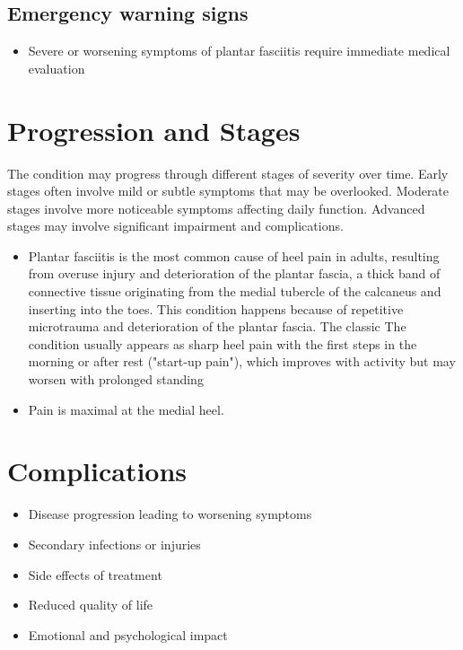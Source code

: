 \subsection{Emergency warning signs}
\begin{itemize}[noitemsep]
  \item Severe or worsening symptoms of plantar fasciitis require immediate medical evaluation
\end{itemize}
\section{Progression and Stages}
The condition may progress through different stages of severity over time. Early stages often involve mild or subtle symptoms that may be overlooked. Moderate stages involve more noticeable symptoms affecting daily function. Advanced stages may involve significant impairment and complications.

\begin{itemize}[noitemsep]
  \item Plantar fasciitis is the most common cause of heel pain in adults, resulting from overuse injury and deterioration of the plantar fascia, a thick band of connective tissue originating from the medial tubercle of the calcaneus and inserting into the toes. This condition happens because of repetitive microtrauma and deterioration of the plantar fascia. The classic The condition usually appears as sharp heel pain with the first steps in the morning or after rest ("start-up pain"), which improves with activity but may worsen with prolonged standing
  \item Pain is maximal at the medial heel.
\end{itemize}
\section{Complications}
\begin{itemize}[noitemsep]
  \item Disease progression leading to worsening symptoms
  \item Secondary infections or injuries
  \item Side effects of treatment
  \item Reduced quality of life
  \item Emotional and psychological impact
\end{itemize}
